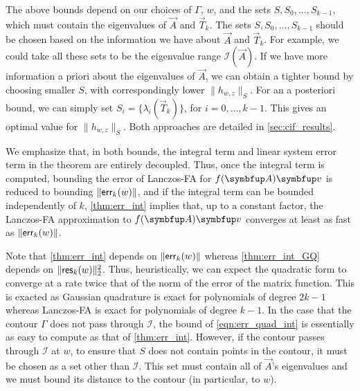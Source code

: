 The above bounds depend on our choices of $\Gamma$, $w$, and the sets $S,S_0,\ldots,S_{k-1}$, which must contain the eigenvalues of $\vec A$ and $\vec T_k$. 
The sets $S,S_0,\ldots,S_{k-1}$ should be chosen based on the information we have about $\vec A$ and $\vec T_k$. 
For example, we could take all these sets to be the eigenvalue range $\mathcal{I}( \vec A)$. 
If we have more information a priori about the eigenvalues of $\vec A$, we can obtain a tighter bound by choosing smaller $S$, with correspondingly lower $\|h_{w,z}\|_{S}$. 
For an a posteriori bound, we can simply set $S_i = \{ \lambda_i(\vec T_k) \}$, for $i = 0,\ldots,k-1$. 
This gives an optimal value for $\|h_{w,z}\|_{S}$. Both approaches are detailed in \cref{sec:cif_results}.

We emphasize that, in both bounds, the integral term and linear system error term in the theorem are entirely decoupled.
Thus, once the integral term is computed, bounding the error of Lanczos-FA for \( \fA\vec{v} \) is reduced to bounding \( \| \textup{\textsf{err}}_k(w) \| \), and if the integral term can be bounded independently of \( k \), \cref{thm:err_int} implies that, up to a constant factor, the Lanczos-FA approximation to \( \fA\vec{v} \) converges at least as fast as \( \| \textup{\textsf{err}}_k(w) \| \).

Note that \cref{thm:err_int} depends on $\|\textup{\textsf{err}}_k(w)\|$ whereas \cref{thm:err_int_GQ} depends on $\|\textup{\textsf{res}}_k(w)\|_2^2$. 
Thus, heuristically, we can expect the quadratic form to converge at a rate twice that of the norm of the error of the matrix function.
This is exacted as Gaussian quadrature is exact for polynomials of degree \( 2k-1 \) whereas Lanczos-FA is exact for polynomials of degree \( k-1 \). 
In the case that the contour $\Gamma$ does not pass through \( \mathcal{I} \), the bound of \cref{eqn:err_quad_int} is essentially  as easy to compute as that of  \cref{thm:err_int}.
However, if the contour passes through \( \mathcal{I} \) at \( w \), to ensure that \( S \) does not contain points in the contour, it must be chosen as a set other than $\mathcal{I}$. This set must contain all of $\vec A$'s eigenvalues and we must bound its distance to the contour (in particular, to $w$).

